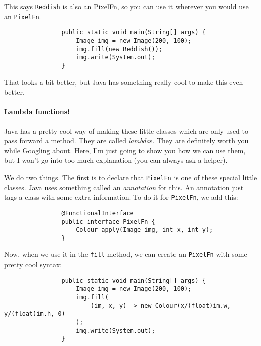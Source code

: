 \documentclass{article}
\begin{document}
            This says \texttt{Reddish} is also an PixelFn, so you can use it wherever you would use an \texttt{PixelFn}.

            \begin{verbatim}
                public static void main(String[] args) {
                    Image img = new Image(200, 100);
                    img.fill(new Reddish());
                    img.write(System.out);
                }
            \end{verbatim}
            
            That looks a bit better, but Java has something really cool to make this even better.

        \newpage
        \paragraph{Lambda functions!}
            Java has a pretty cool way of making these little classes which are only used to pass forward a method. They are called
            \emph{lambda}s. They are definitely worth you while Googling about. Here, I'm just going to show you how we can use them, but I
            won't go into too much explanation (you can always ask a helper).
            
            We do two things. The first is to declare that \texttt{PixelFn} is one of these special little classes. Java uses something
            called an \emph{annotation} for this. An annotation just tags a class with some extra information. To do it for
            \texttt{PixelFn}, we add this:
            
            \begin{verbatim}
                @FunctionalInterface
                public interface PixelFn {
                    Colour apply(Image img, int x, int y);
                }
            \end{verbatim}
            
            Now, when we use it in the \texttt{fill} method, we can create an \texttt{PixelFn} with some pretty cool syntax:
            
            \begin{verbatim}
                public static void main(String[] args) {
                    Image img = new Image(200, 100);
                    img.fill(
                        (im, x, y) -> new Colour(x/(float)im.w, y/(float)im.h, 0)
                    );
                    img.write(System.out);
                }
            \end{verbatim}
            
\end{document}
